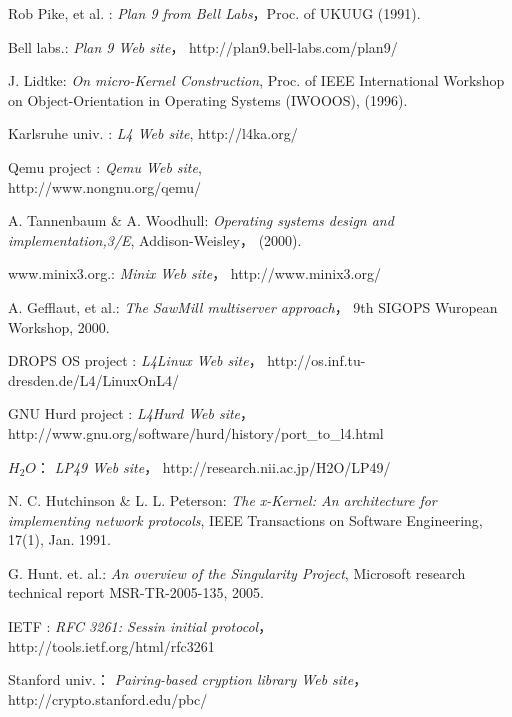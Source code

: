 \documentclass{ieicej}
\begin{document}
\begin{thebibliography}{10}


Rob Pike, et al. : {\em Plan 9 from Bell Labs}，Proc. of UKUUG (1991).

Bell labs.: {\em Plan 9 Web site}， 
http://plan9.bell-labs.com/plan9/

J. Lidtke: {\em On micro-Kernel Construction}, 
Proc. of IEEE International Workshop on Object-Orientation in Operating Systems (IWOOOS), (1996). 

Karlsruhe univ. : {\em L4 Web site}, 
http://l4ka.org/ 


Qemu project : {\em Qemu Web site},\\
http://www.nongnu.org/qemu/ 


A. Tannenbaum \& A. Woodhull: {\em Operating systems design and implementation,3/E}, 
Addison-Weisley， (2000).

www.minix3.org.: {\em Minix  Web site}， 
http://www.minix3.org/

A. Gefflaut, et al.: {\em The SawMill multiserver approach}， 
9th SIGOPS Wuropean Workshop, 2000.

DROPS OS project : {\em L4Linux Web site}， 
http://os.inf.tu-dresden.de/L4/LinuxOnL4/

GNU Hurd project : {\em L4Hurd Web site}，\\ 
http://www.gnu.org/software/hurd/history/port\_to\_l4.html


$H_2O$： {\em LP49  Web site}， 
http://research.nii.ac.jp/H2O/LP49/

N. C. Hutchinson \& L. L. Peterson: 
{\em The x-Kernel: An architecture for implementing network protocols},  
IEEE Transactions on Software Engineering, 17(1), Jan. 1991. 


G. Hunt. et. al.: {\em An overview of the Singularity Project},
Microsoft research technical report MSR-TR-2005-135, 2005.

IETF : {\em RFC 3261: Sessin initial protocol}，\\ 
http://tools.ietf.org/html/rfc3261


Stanford univ.： {\em Pairing-based cryption library Web site}， 
http://crypto.stanford.edu/pbc/


\end{thebibliography}


\begin{biography}
%

\end{biography}
\end{document}

